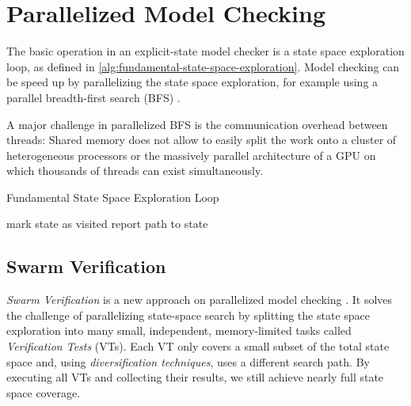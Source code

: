 \documentclass[
fancyheadings, %
%
%
]{stsreprt}
\begin{document}
\section{Parallelized Model Checking}
\label{section:background:parallelized-model-checking}

The basic operation in an explicit-state model checker is a state space exploration loop, as defined in \cref{alg:fundamental-state-space-exploration}.
Model checking can be speed up by parallelizing the state space exploration, for example using a parallel breadth-first search (BFS) \cite{Holzmann2012.Paralellizing-SPIN}.

A major challenge in parallelized BFS is the communication overhead between threads:
Shared memory does not allow to easily split the work onto a cluster of heterogeneous processors or the massively parallel architecture of a GPU on which thousands of threads can exist simultaneously.

\begin{algorithm}
    \caption{Fundamental State Space Exploration Loop}
    \label{alg:fundamental-state-space-exploration}
    \begin{algorithmic}
        \State mark state as visited
        \State report path to state
        \EndIf
        \EndWhile
    \end{algorithmic}
\end{algorithm}

\subsection{Swarm Verification}
\label{section:background:swarm-verification}

\emph{Swarm Verification} is a new approach on parallelized model checking \cite{Holzmann2008.Swarm-Verification}.
It solves the challenge of parallelizing state-space search by splitting the state space exploration into many small, independent, memory-limited tasks called \emph{Verification Tests} (VTs).
Each VT only covers a small subset of the total state space and, using \emph{diversification techniques}, uses a different search path.
By executing all VTs and collecting their results, we still achieve nearly full state space coverage.
\end{document}
